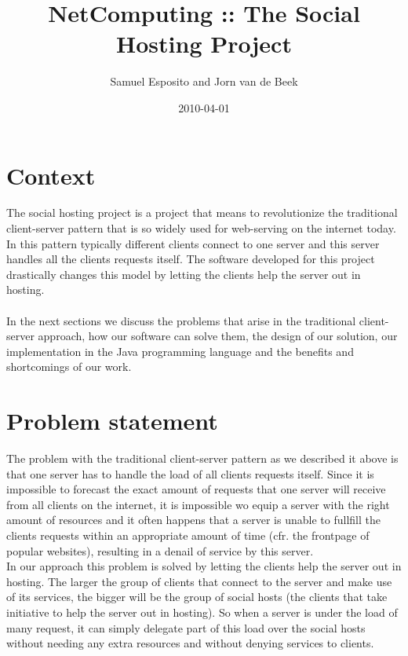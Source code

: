 \documentclass[a4paper, 10pt]{article}
\title{NetComputing :: The Social Hosting Project}
\author{Samuel Esposito and Jorn van de Beek}
\date{2010-04-01}
\begin{document}
\ifpdf
{}
\else
{}
\fi

\maketitle

\section{Context}

The social hosting project is a project that means to revolutionize the traditional client-server pattern that is so widely used for web-serving on the internet today. In this pattern typically different clients connect to one server and this server handles all the clients requests itself. The software developed for this project drastically changes this model by letting the clients help the server out in hosting. 
\\
\\
In the next sections we discuss the problems that arise in the traditional client-server approach, how our software can solve them, the design of our solution, our implementation in the Java programming language and the benefits and shortcomings of our work. 

\section{Problem statement}

The problem with the traditional client-server pattern as we described it above is that one server has to handle the load of all clients requests itself. Since it is impossible to forecast the exact amount of requests that one server will receive from all clients on the internet, it is impossible wo equip a server with the right amount of resources and it often happens that a server is unable to fullfill the clients requests within an appropriate amount of time (cfr. the frontpage of popular websites), resulting in a denail of service by this server. 
\\
In our approach this problem is solved by letting the clients help the server out in hosting. The larger the group of clients that connect to the server and make use of its services, the bigger will be the group of social hosts (the clients that take initiative to help the server out in hosting). So when a server is under the load of many request, it can simply delegate part of this load over the social hosts without needing any extra resources and without denying services to clients.
\end{document}
